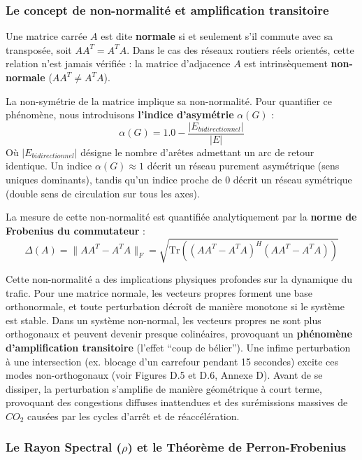 \documentclass[11pt, a4paper]{article}
\begin{document}
\subsubsection{Le concept de non-normalité et amplification
transitoire}\label{le-concept-de-non-normalituxe9-et-amplification-transitoire}

Une matrice carrée \(A\) est dite \textbf{normale} si et seulement s'il
commute avec sa transposée, soit \(A A^T = A^T A\). Dans le cas des
réseaux routiers réels orientés, cette relation n'est jamais vérifiée :
la matrice d'adjacence \(A\) est intrinsèquement \textbf{non-normale}
(\(A A^T \neq A^T A\)).

La non-symétrie de la matrice implique sa non-normalité. Pour quantifier
ce phénomène, nous introduisons \textbf{l'indice d'asymétrie}
\(\alpha(G)\) : \[\alpha(G) = 1.0 - \frac{|E_{bidirectionnel}|}{|E|}\]
Où \(|E_{bidirectionnel}|\) désigne le nombre d'arêtes admettant un arc
de retour identique. Un indice \(\alpha(G) \approx 1\) décrit un réseau
purement asymétrique (sens uniques dominants), tandis qu'un indice
proche de 0 décrit un réseau symétrique (double sens de circulation sur
tous les axes).

La mesure de cette non-normalité est quantifiée analytiquement par la
\textbf{norme de Frobenius du commutateur} :
\[\Delta(A) = \| A A^T - A^T A \|_F = \sqrt{\text{Tr}\left( (A A^T - A^T A)^H (A A^T - A^T A) \right)}\]

Cette non-normalité a des implications physiques profondes sur la
dynamique du trafic. Pour une matrice normale, les vecteurs propres
forment une base orthonormale, et toute perturbation décroît de manière
monotone si le système est stable. Dans un système non-normal, les
vecteurs propres ne sont plus orthogonaux et peuvent devenir presque
colinéaires, provoquant un \textbf{phénomène d'amplification
transitoire} (l'effet ``coup de bélier''). Une infime perturbation à une
intersection (ex. blocage d'un carrefour pendant 15 secondes) excite ces
modes non-orthogonaux (voir Figures D.5 et D.6, Annexe D). Avant de se
dissiper, la perturbation s'amplifie de manière géométrique à court
terme, provoquant des congestions diffuses inattendues et des
surémissions massives de \(CO_2\) causées par les cycles d'arrêt et de
réaccélération.

\subsubsection{\texorpdfstring{Le Rayon Spectral (\(\rho\)) et le
Théorème de
Perron-Frobenius}{Le Rayon Spectral (\textbackslash rho) et le Théorème de Perron-Frobenius}}\label{le-rayon-spectral-rho-et-le-thuxe9oruxe8me-de-perron-frobenius}
\end{document}
